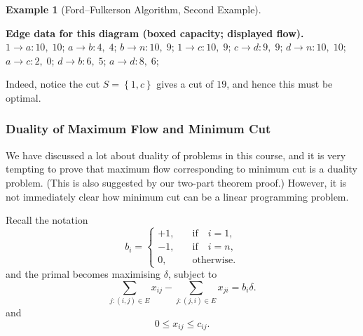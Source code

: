 \documentclass[11pt]{article}
\theoremstyle{definition}
\newtheorem{example}[theorem]{Example}
\theoremstyle{remark}
\newcommand{\pqty}[1]{\left(#1\right)}
\newcommand{\Bqty}[1]{\left\{#1\right\}}
\newcommand{\qif}{\quad\text{if}\quad}
\newcommand{\qotherwise}{\quad\text{otherwise}}
\begin{document}
\begin{example}[Ford--Fulkerson Algorithm, Second Example]
\begin{center}
\par\smallskip\noindent\textbf{Edge data for this diagram (boxed capacity; displayed flow).}\(1\to a: \boxed{10},\;10\); \(a\to b: \boxed{4},\;4\); \(b\to n: \boxed{10},\;9\); \(1\to c: \boxed{10},\;9\); \(c\to d: \boxed{9},\;9\); \(d\to n: \boxed{10},\;10\); \(a\to c: \boxed{2},\;0\); \(d\to b: \boxed{6},\;5\); \(a\to d: \boxed{8},\;6\); 

    \end{center}

    Indeed, notice the cut \(S = \Bqty{1, c}\) gives a cut of \(19\), and hence this must be optimal.
\end{example}

\subsubsection{Duality of Maximum Flow and Minimum Cut}

We have discussed a lot about duality of problems in this course, and it is very tempting to prove that maximum flow corresponding to minimum cut is a duality problem. (This is also suggested by our two-part theorem proof.) However, it is not immediately clear how minimum cut can be a linear programming problem.

Recall the notation
\[
    b_i = \begin{cases}
        +1, &\qif i = 1, \\
        -1, &\qif i = n, \\
        0, &\qotherwise.
    \end{cases}
\]
and the primal becomes maximising \(\delta\), subject to
\[
    \sum_{j: \pqty{i, j} \in E} x_{ij} - \sum_{j: \pqty{j, i} \in E} x_{ji} = b_i \delta.
\]
and
\[
    0 \leq x_{ij} \leq c_{ij}.
\]
\end{document}
